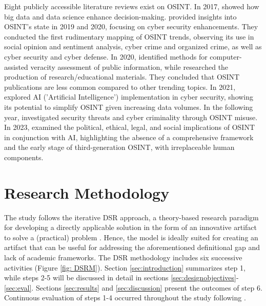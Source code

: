 \documentclass[10pt]{article}
\begin{document}
Eight publicly accessible literature reviews exist on OSINT. In 2017, \cite{DosPassos.2017} showed how big data and data science enhance decision-making. \cite{PastorGalindo.2019, PastorGalindo.2020}
provided insights into OSINT's state in 2019 and 2020, focusing on cyber security
enhancements. They conducted the first rudimentary mapping of OSINT trends, observing its use in social opinion and sentiment
analysis, cyber crime and organized crime, as well as cyber security and cyber defense. In 2020, \cite{GarciaLozano.2020} identified methods for computer-assisted veracity assessment of public information, while
\cite{HerreraCubides.2020} researched the production of research/educational materials. They concluded that OSINT
publications are less common compared to other trending topics. In 2021, \cite{Yogish.2021} explored AI ('Artificial Intelligence') implementation in cyber security,
showing its potential to simplify OSINT given increasing data volumes. In the following year,
\cite{Hwang.2022} investigated security threats and cyber criminality through OSINT misuse.
In 2023, \cite{Ghioni.2023} examined the political, ethical, legal, and social implications of
OSINT in conjunction with AI, highlighting the absence of a comprehensive framework and the early stage of third-generation OSINT, with irreplaceable human components.

\section{Research Methodology}

The study follows the iterative DSR approach, a theory-based research paradigm for developing a directly applicable solution in the form of an innovative artifact \cite{vomBrocke.2020b}
to solve a (practical) problem \cite{Peffers.2007}. Hence, the model is ideally suited for creating an artifact that can be useful for addressing the aforementioned definitional gap and lack of academic frameworks. The DSR methodology includes
six successive activities \cite{Peffers.2007} (Figure \ref{fig: DSRM}). Section \ref{sec:introduction} summarizes step 1, while steps 2-5 will be discussed in detail in sections \ref{sec:designobjectives}-\ref{sec:eval}. Sections \ref{sec:results} and \ref{sec:discussion} present the outcomes of step 6. Continuous evaluation of steps 1-4 occurred throughout the study following \cite{Sonnenberg.2012}.
\end{document}
